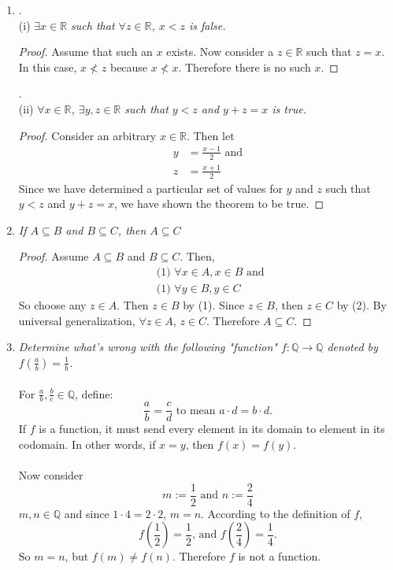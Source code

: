 \documentclass{amsart}
\begin{document}
\begin{enumerate}[1.]
\item .\\
(i)\emph{ $\exists x\in\mathbb{R}$ such that $\forall z\in\mathbb{R}$, $x < z$ is false.}
\begin{proof}
Assume that such an $x$ exists. Now consider a $z\in\mathbb{R}$
such that $z = x$. In this case, $x \nless z$ because $ x \nless x$. Therefore there is no such $x$.
\end{proof}
.\\
(ii)\emph{ $\forall x\in\mathbb{R}$, $\exists y,z \in\mathbb{R}$ such that $y < z$ and $y+z = x$ is true.}
\begin{proof}
Consider an arbitrary $x\in\mathbb{R}$. Then let
\begin{align*}
    y &= \frac{x-1}{2}  \text{ and}\\
    z &= \frac{x+1}{2}
\end{align*}
Since we have determined a particular set of values for 
$y$ and $z$ such that $y < z$ and $y+z = x$, we have shown 
the theorem to be true.
\end{proof}

\newpage

\item \emph{If $A\subseteq B$ and $B\subseteq C$, then $A\subseteq C$}
\begin{proof}
Assume $A\subseteq B$ and $B\subseteq C$. Then,
\begin{align*}
    &\text{(1) }\forall x\in A, x\in B \text{ and }\\
    &\text{(1) }\forall y\in B, y\in C
\end{align*}
So choose any $z\in A$. Then $z\in B$ by (1). Since $z\in B$, then
$z\in C$ by (2). By universal generalization, $\forall z\in A$,
$z\in C$. Therefore $A\subseteq C$.
\end{proof}

\newpage

\item \emph{Determine what's wrong with the following "function" 
$f:\mathbb{Q}\to \mathbb{Q}$ denoted by $f(\frac{a}{b})=\frac{1}{b}$.} \\\\
For $\frac{a}{b}, \frac{b}{c}\in \mathbb{Q}$, define:
\[
    \frac{a}{b} = \frac{c}{d} \text{ to mean } a\cdot d = b\cdot d.
\] 
If $f$ is a function, it must send every element in its domain to
 element in its codomain. In other words, if
$x=y$, then $f(x)=f(y)$.\\\\

Now consider
\[
    m := \frac{1}{2} \text{ and } n := \frac{2}{4}    
\]
$m, n\in\mathbb{Q}$ and since $1\cdot 4 = 2\cdot 2$, $m=n$. According
to the definition of $f$,
\[
    f\left(\frac{1}{2}\right) = \frac{1}{2} \text{, and }
    f\left(\frac{2}{4}\right) = \frac{1}{4}.
\]
So $m = n$, but $f(m)\neq f(n)$. Therefore $f$ is not a function.
\end{enumerate}
\end{document}
